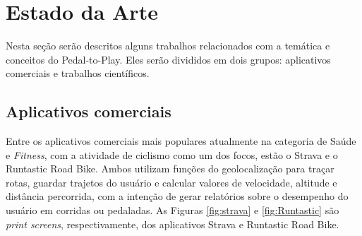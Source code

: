 \chapter{Estado da Arte} \label{cap:estadoarte}
Nesta seção serão descritos alguns trabalhos relacionados com a temática e conceitos do Pedal-to-Play. Eles serão divididos em dois grupos: aplicativos comerciais e trabalhos científicos.

\section{Aplicativos comerciais}
Entre os aplicativos comerciais mais populares atualmente na categoria de Saúde e \textit{Fitness}, com a atividade de ciclismo como um dos focos, estão o Strava e o Runtastic Road Bike. Ambos utilizam funções do geolocalização para traçar rotas, guardar trajetos do usuário e calcular valores de velocidade, altitude e distância percorrida, com a intenção de gerar relatórios sobre o desempenho do usuário em corridas ou pedaladas. As Figuras \ref{fig:strava} e \ref{fig:Runtastic} são \textit{print screens}, respectivamente, dos aplicativos Strava e Runtastic Road Bike.\par 

